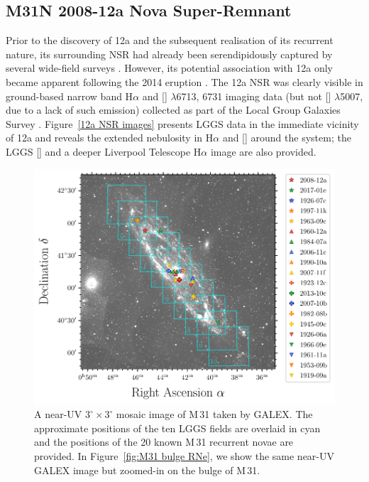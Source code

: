 \documentclass[fleqn,usenatbib]{mnras}
\begin{document}
\subsection{M31N 2008-12a Nova Super-Remnant}
Prior to the discovery of 12a \citep[by][]{2008Nis} and the subsequent realisation of its recurrent nature, its surrounding NSR had already been serendipidously captured by several wide-field surveys \cite[see, for e.g.,][]{1992A&AS...92..625W,2011AJ....142..139A}. However, its potential association with 12a only became apparent following the 2014 eruption \citep[see][and references therein]{2015A&A...580A..45D,2019Natur.565..460D}. The 12a NSR was clearly visible in ground-based narrow band H$\alpha$ and [] $\lambda$6713, 6731 imaging data (but not [] $\lambda$5007, due to a lack of such emission) collected as part of the Local Group Galaxies Survey \citep[LGGS;][]{2006AJ....131.2478M,2007AJ....134.2474M}. Figure~\ref{12a NSR images} presents LGGS data in the immediate vicinity of 12a and reveals the extended nebulosity in H$\alpha$ and [] around the system; the LGGS [] and a deeper Liverpool Telescope H$\alpha$ image are also provided.
\begin{figure}
\includegraphics[width=\textwidth]{Figures/GALEX_M31_LGGS_Fields.pdf}
\caption{A near-UV $3^\circ\times 3^\circ$ mosaic image of M\,31 taken by GALEX. The approximate positions of the ten LGGS fields are overlaid in cyan and the positions of the 20 known M\,31 recurrent novae are provided. In Figure~\ref{fig:M31 bulge RNe}, we show the same near-UV GALEX image but zoomed-in on the bulge of M\,31. \label{fig:LGGS-fields}}
\end{figure}
\end{document}
